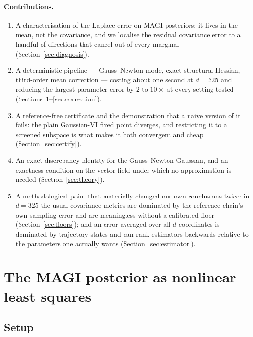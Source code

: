 \documentclass[11pt]{article}
\theoremstyle{plain}
\theoremstyle{definition}
\theoremstyle{remark}
\begin{document}
\paragraph{Contributions.}
\begin{enumerate}[leftmargin=1.5em,itemsep=1pt]
\item A characterisation of the Laplace error on MAGI posteriors: it lives in the mean, not the
covariance, and we localise the residual covariance error to a handful of directions that cancel
out of every marginal (Section~\ref{sec:diagnosis}).
\item A deterministic pipeline --- Gauss--Newton mode, exact structural Hessian, third-order mean
correction --- costing about one second at $d = 325$ and reducing the largest parameter error by
$2$ to $10\times$ at every setting tested (Sections~\ref{sec:lsq}--\ref{sec:correction}).
\item A reference-free certificate and the demonstration that a naive version of it fails: the
plain Gaussian-VI fixed point diverges, and restricting it to a screened subspace is what makes it
both convergent and cheap (Section~\ref{sec:certify}).
\item An exact discrepancy identity for the Gauss--Newton Gaussian, and an exactness condition on
the vector field under which no approximation is needed (Section~\ref{sec:theory}).
\item A methodological point that materially changed our own conclusions twice: in $d = 325$ the
usual covariance metrics are dominated by the reference chain's own sampling error and are
meaningless without a calibrated floor (Section~\ref{sec:floors}); and an error averaged over all
$d$ coordinates is dominated by trajectory states and can rank estimators backwards relative to the
parameters one actually wants (Section~\ref{sec:estimator}).
\end{enumerate}

\section{The MAGI posterior as nonlinear least squares}
\label{sec:lsq}

\subsection{Setup}
\end{document}
